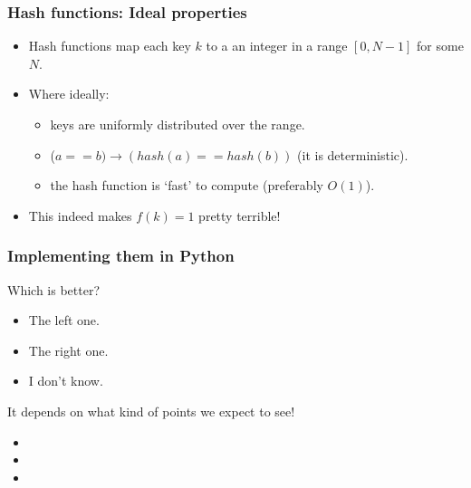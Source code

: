 \begin{frame}
	\frametitle{Hash functions: Ideal properties}
	
		\begin{itemize}
			\item Hash functions map each key $k$ to a an integer in a range $[0, N-1]$ for some $N$.
			\item Where ideally:
			
			\begin{itemize}
				\item keys are uniformly distributed over the range.
					
				\item ($a == b) \to (\mathit{hash}(a) == \mathit{hash}(b))$ (it is deterministic).
					
				\item the hash function is `fast' to compute (preferably $O(1)$).
			\end{itemize}
			\item This indeed makes $f(k) = 1$ pretty terrible!
			\end{itemize}	
\end{frame}

\begin{frame}
	\frametitle{Implementing them in Python}

	Which is better?	
			\begin{itemize}
			\item The left one.
			\item The right one.
			\item I don't know.
		\end{itemize}
		
			It depends on what kind of points we expect to see!

		
			\begin{itemize}
			\item 
			\item 
			\item 
	\end{itemize}
	


		
\end{frame}

